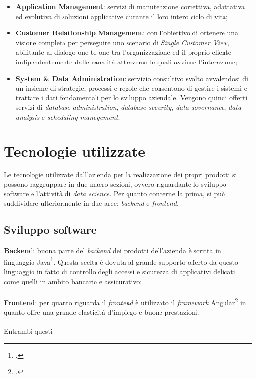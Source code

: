 \begin{itemize}
	\item \textbf{Application Management}: servizi di manutenzione correttiva, adattativa ed evolutiva di soluzioni applicative durante il loro intero ciclo di vita;
	\item \textbf{Customer Relationship Management}: con l'obiettivo di ottenere una visione completa per perseguire uno scenario di \textit{Single Customer View}, abilitante al dialogo one-to-one tra l'organizzazione ed il proprio cliente indipendentemente dalle canalità attraverso le quali avviene l'interazione;
	\item \textbf{System \& Data Administration}: servizio consultivo svolto avvalendosi di un insieme di strategie, processi e regole che consentono di gestire i sistemi e trattare i dati fondamentali per lo sviluppo aziendale. Vengono quindi offerti servizi di \textit{database administration}, \textit{database security}, \textit{data governance}, \textit{data analysis} e \textit{scheduling management}.
\end{itemize}

\section{Tecnologie utilizzate}

Le tecnologie utilizzate dall’azienda per la realizzazione dei propri prodotti si possono raggruppare in due macro-sezioni, ovvero riguardante lo sviluppo software e l'attività di \textit{data science}.
Per quanto concerne la prima, si può suddividere ulteriormente in due aree: \textit{backend} e \textit{frontend}.
\subsection{Sviluppo software}
\textbf{Backend}: buona parte del \textit{backend} dei prodotti dell'azienda è scritta in linguaggio Java\footcite{https://www.java.com}. Questa scelta è dovuta al grande supporto offerto da questo linguaggio in fatto di controllo degli accessi e sicurezza di applicativi delicati come quelli in ambito bancario e assicurativo;\\\\
\textbf{Frontend}: per quanto riguarda il \textit{frontend} è utilizzato il \textit{framework} Angular\footcite{https://angular.io/} in quanto offre una grande elasticità d'impiego e buone prestazioni. \\
\\
Entrambi questi
